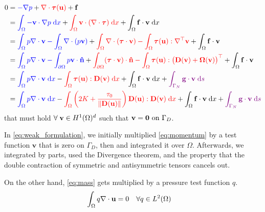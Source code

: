 \documentclass[11 pt]{report}
\begin{document}
\begin{equation}
    \begin{aligned}
        0 &= {\color{blue}-\nabla p} + {\color{red} \nabla \cdot \boldsymbol{\tau}(\mathbf{u})} + \mathbf{f}\\
        &= {\color{blue} \int_{\Omega} - \mathbf{v} \cdot \nabla p \;\dd x} + {\color{red} \int_{\Omega} \mathbf{v} \cdot (\nabla \cdot \boldsymbol{\tau}) \;\dd x} + \int_{\Omega} \mathbf{f} \cdot \mathbf{v}  \;\dd x\\
        &= {\color{blue} \int_{\Omega} p \nabla \cdot \mathbf{v} - \int_{\Omega} \nabla \cdot (p\mathbf{v})} + {\color{red} \int_{\Omega} \nabla \cdot (\boldsymbol{\tau} \cdot \mathbf{v}) - \int_{\Omega}  \boldsymbol{\tau} (\mathbf{u}) : \nabla^\top \mathbf{v}} + \int_{\Omega} \mathbf{f} \cdot \mathbf{v}\\
        &= {\color{blue} \int_{\Omega} p \nabla \cdot \mathbf{v} - \int_{\partial \Omega} p \mathbf{v} \cdot \mathbf{\hat n}} + {\color{red} \int_{\partial\Omega} (\boldsymbol{\tau} \cdot \mathbf{v}) \cdot \mathbf{\hat n} - \int_{\Omega}  \boldsymbol{\tau} (\mathbf{u}) : \big(\mathbf{D}(\mathbf{v}) + \mathbf{\Omega}(\mathbf{v})\big)^\top} + \int_{\Omega} \mathbf{f} \cdot \mathbf{v} \\
        &= {\color{blue} \int_{\Omega} p \nabla \cdot \mathbf{v} \;\dd x} - {\color{red} \int_{\Omega}  \boldsymbol{\tau} (\mathbf{u}) : \mathbf{D}(\mathbf{v}) \;\dd x} + \int_{\Omega} \mathbf{f} \cdot \mathbf{v} \;\dd x + {\color{violet}\int_{\Gamma_N} \mathbf{g} \cdot \mathbf{v} \; \dd s}\\
        &= {\color{blue} \int_{\Omega} p \nabla \cdot \mathbf{v} \;\dd x} - {\color{red} \int_{\Omega}  \left( 2K + \frac{\tau_0}{\|\mathbf{D}(\mathbf{u})\|} \right) \mathbf{D}(\mathbf{u}) : \mathbf{D}(\mathbf{v}) \;\dd x} + \int_{\Omega} \mathbf{f} \cdot \mathbf{v} \;\dd x + {\color{violet}\int_{\Gamma_N} \mathbf{g} \cdot \mathbf{v} \; \dd s}
    \end{aligned}\label{eq:weak_formulation}
\end{equation}
that must hold $\forall \; \mathbf{v} \in H^1(\Omega)^d$ such that $\mathbf{v} = \mathbf{0} \text{ on } \Gamma_D$.

In \cref{eq:weak_formulation}, we initially multiplied \autoref{eq:momentum} by a test function $\mathbf{v}$ that is zero on $\Gamma_D$, then and integrated it over $\Omega$. Afterwards, we integrated by parts, used the Divergence theorem, and the property that the double contraction of symmetric and antisymmetric tensors cancels out.

On the other hand, \autoref{eq:mass} gets multiplied by a pressure test function $q$.
\begin{equation}
    \begin{aligned}
        \int_{\Omega} q \nabla \cdot \mathbf{u} &= 0  && \forall q \in L^2(\Omega)
    \end{aligned}
    \label{eq:weak_formulation_p}
\end{equation}
\end{document}
